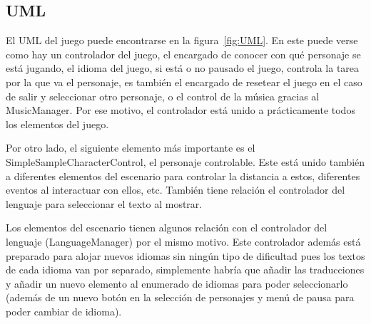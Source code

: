 \documentclass[12pt, a4paper,twoside,titlepage]{book}
\begin{document}
\subsection{UML}


El UML del juego puede encontrarse en la figura~\ref{fig:UML}. En este puede verse como hay un controlador del juego, el encargado de conocer con qué personaje se está jugando, el idioma del juego, si está o no pausado el juego, controla la tarea por la que va el personaje, es también el encargado de resetear el juego en el caso de salir y seleccionar otro personaje, o el control de la música gracias al MusicManager. Por ese motivo, el controlador está unido a prácticamente todos los elementos del juego. 

Por otro lado, el siguiente elemento más importante es el SimpleSampleCharacterControl, el personaje controlable. Este está unido también a diferentes elementos del escenario para controlar la distancia a estos, diferentes eventos al interactuar con ellos, etc. También tiene relación el controlador del lenguaje para seleccionar el texto al mostrar. 

Los elementos del escenario tienen algunos relación con el controlador del lenguaje (LanguageManager) por el mismo motivo. Este controlador además está preparado para alojar nuevos idiomas sin ningún tipo de dificultad pues los textos de cada idioma van por separado, simplemente habría que añadir las traducciones y añadir un nuevo elemento al enumerado de idiomas para poder seleccionarlo (además de un nuevo botón en la selección de personajes y menú de pausa para poder cambiar de idioma). 
\end{document}
